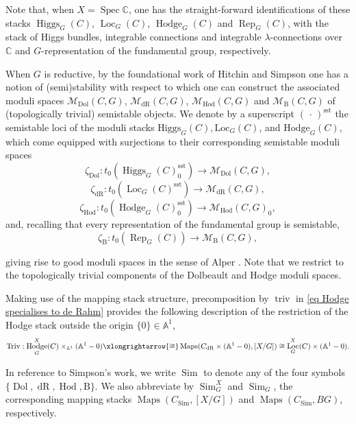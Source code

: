 \documentclass[11pt, a4paper]{amsart}
\numberwithin{equation}{section}
\theoremstyle{definition}
\theoremstyle{remark}
\DeclareMathOperator{\Spec}{Spec}
\DeclareMathOperator{\Higgs}{Higgs}
\DeclareMathOperator{\Maps}{Maps}
\DeclareMathOperator{\Loc}{Loc}
\DeclareMathOperator{\Rep}{Rep}
\DeclareMathOperator{\Hodge}{Hodge}
\DeclareMathOperator{\triv}{triv}
\DeclareMathOperator{\Triv}{Triv}
\DeclareMathOperator{\Dol}{Dol}
\DeclareMathOperator{\dR}{dR}
\DeclareMathOperator{\Hod}{Hod}
\DeclareMathOperator{\Sim}{Sim}
\DeclareMathOperator{\sst}{sst}
\newcommand{\Mm}{\mathcal{M}}
\newcommand{\B}{\mathrm{B}}
\renewcommand{\AA}{\mathbb{A}}
\newcommand{\CC}{\mathbb{C}}
\renewcommand{\to}{\longrightarrow}
\begin{document}
Note that, when $X = \Spec \CC$, one has the straight-forward identifications of these stacks $\Higgs_G(C)$, $\Loc_G(C)$, $\Hodge_G(C)$ and $\Rep_G(C)$, with the stack of Higgs bundles, integrable connections and integrable $\lambda$-connections over $\CC$ and $G$-representation of the fundamental group, respectively.  

When $G$ is reductive, by the foundational work of Hitchin \cite{hitchin_self} and Simpson \cite{simpson1, simpson2} one has a notion of (semi)stability with respect to which one can construct the associated moduli spaces $\Mm_{\Dol}(C,G)$, $\Mm_{\dR}(C,G)$, $\Mm_{\Hod}(C,G)$ and $\Mm_{\B}(C,G)$ of (topologically trivial) semistable objects. We denote by a superscript $( \, \cdot \, )^{\mathrm{sst}}$ the semistable loci of the moduli stacks $\mathrm{Higgs}_G(C), \mathrm{Loc}_G(C)$, and $\mathrm{Hodge}_G(C)$, which come equipped with surjections to their corresponding semistable moduli spaces
\[
\zeta_{\Dol} : t_0\left (\Higgs_G(C)^{\sst}_0 \right ) \to \Mm_{\Dol}(C,G),
\]
\[
\zeta_{\dR} : t_0\left (\Loc_G(C)^{\sst} \right ) \to \Mm_{\dR}(C,G),
\]
\[
\zeta_{\Hod} : t_0\left (\Hodge_G(C)^{\sst}_0 \right ) \to \Mm_{\Hod}(C,G)_0,
\]
and, recalling that every representation of the fundamental group is semistable,
\[
\zeta_{\B} : t_0\left (\Rep_G(C) \right ) \to \Mm_{\B}(C,G),
\]

giving rise to good moduli spaces in the sense of Alper \cite{alper_good}. Note that we restrict to the topologically trivial components of the Dolbeault and Hodge moduli spaces.



Making use of the mapping stack structure, precomposition by $\triv$ in \eqref{eq Hodge specialises to de Rahm} provides the following description of the restriction of the Hodge stack outside the origin $\{ 0 \} \in \AA^1$,
\begin{equation} \label{eq algebraic Triv map}
\Triv : \Hodge_G^X(C) \times_{\AA^1} (\AA^1 - 0) \xlongrightarrow{\cong} \Maps(C_{\dR} \times (\AA^1 - 0), [X/G]) \cong \Loc_G^X(C) \times (\AA^1 - 0).  
\end{equation} 


In reference to Simpson's work, we write $\Sim$ to denote any of the four symbols $\{\Dol, \dR, \Hod, \B \}$. We also abbreviate by $\Sim^X_G$ and $\Sim_G$, the corresponding mapping stacks $\Maps(C_{\Sim}, [X/G])$ and $\Maps(C_{\Sim}, BG)$, respectively.
\end{document}
